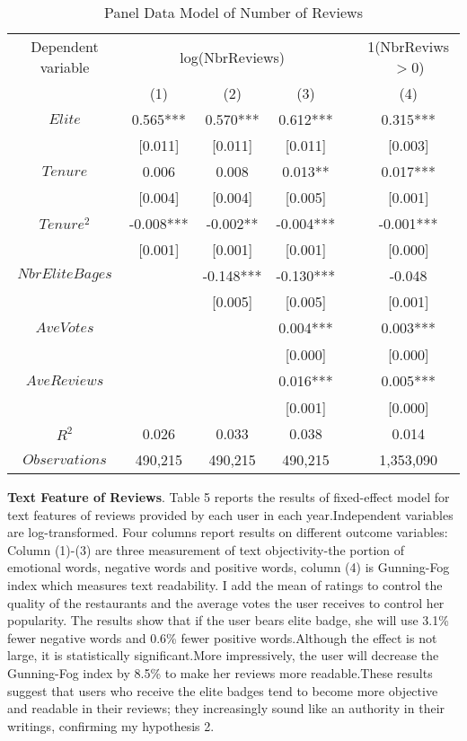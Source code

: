 \documentclass[12pt]{article}%
\newcommand{\ra}[1]{\renewcommand{\arraystretch}{#1}}
\begin{document}
\begin{table*}[htbp]\centering
\ra{1.3}
\renewcommand\thetable{4}
  \caption{Panel Data Model of Number of Reviews  \label{PrePoIr} } 
\begin{tabular}{@{}cccccc@{}}

\toprule[1.5pt]
Dependent variable & \multicolumn{3}{c}{log(NbrReviews)} & \phantom{abc}& \multicolumn{1}{c}{1(NbrReviws$>$0)} \\ 
\cmidrule{2-4} \cmidrule{6-6} 
& (1) & (2) & (3) && (4)  \\ \midrule
$Elite$ & 0.565*** & 0.570*** & 0.612*** && 0.315***  \\
	 & [0.011]& [0.011]& [0.011]&& [0.003]\\
$Tenure$ &0.006 & 0.008& 0.013**&& 0.017***\\
	 & [0.004]& [0.004]& [0.005]&& [0.001]\\
$Tenure^2$ & -0.008***& -0.002**&-0.004*** && -0.001***\\
	 & [0.001]& [0.001]& [0.001]&& [0.000]\\
$NbrEliteBages$ & &-0.148*** &-0.130*** &&-0.048 \\
	& &[0.005] & [0.005] && [0.001]\\
$AveVotes$ & & & 0.004*** &&0.003***\\
	&　& &[0.000] &&[0.000]\\
$AveReviews$ & & & 0.016*** &&0.005***\\
	&　& &[0.001] &&[0.000]\\
$R^2$ &0.026 &0.033 &0.038 &&0.014\\
$Observations$ &490,215 &490,215 &490,215 &&1,353,090\\
\bottomrule
\end{tabular}

\end{table*}

\textbf{Text Feature of Reviews}. Table 5 reports the results of fixed-effect model for text features of reviews provided by each user in each year.Independent variables are log-transformed. Four columns report results on different outcome variables: Column (1)-(3) are three measurement of text objectivity-the portion of emotional words, negative words and positive words, column (4) is Gunning-Fog index which measures text readability. I add the mean of ratings to control the quality of the restaurants and the average votes the user receives to control her popularity. The results show that if the user bears elite badge, she will use 3.1\% fewer negative words and 0.6\% fewer positive words.Although the effect is not large, it is statistically significant.More impressively, the user will decrease the Gunning-Fog index by 8.5\% to make her reviews more readable.These results suggest that users who receive the elite badges tend to become more objective and readable in their reviews; they increasingly sound like an authority in their writings, confirming my hypothesis 2.  
\end{document}
